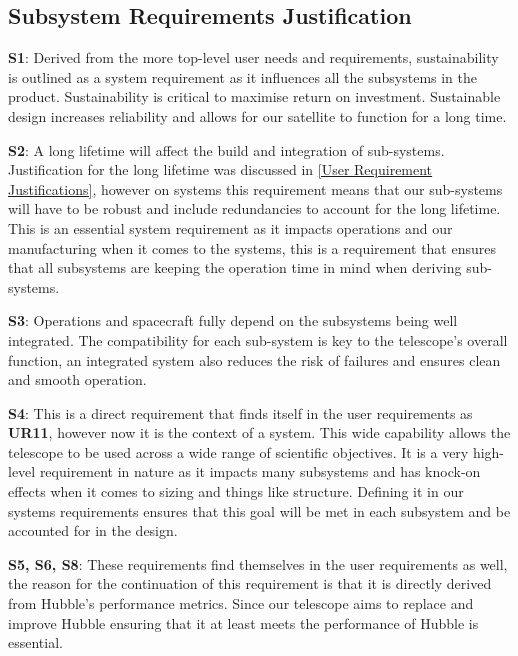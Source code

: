 \subsection{Subsystem Requirements Justification}
\textbf{S1}: Derived from the more top-level user needs and requirements, sustainability is outlined as a system requirement as it influences all the subsystems in the product. Sustainability is critical to maximise return on investment. Sustainable design increases reliability and allows for our satellite to function for a long time. \\
\vspace{1.5mm}

\textbf{S2}: A long lifetime will affect the build and integration of sub-systems. Justification for the long lifetime was discussed in \ref{User Requirement Justifications}, however on systems this requirement means that our sub-systems will have to be robust and include redundancies to account for the long lifetime. This is an essential system requirement as it impacts operations and our manufacturing when it comes to the systems, this is a requirement that ensures that all subsystems are keeping the operation time in mind when deriving sub-systems.\\
\vspace{1.5mm}

\textbf{S3}: Operations and spacecraft fully depend on the subsystems being well integrated. The compatibility for each sub-system is key to the telescope's overall function, an integrated system also reduces the risk of failures and ensures clean and smooth operation.\\
\vspace{1.5mm}

\textbf{S4}: This is a direct requirement that finds itself in the user requirements as \textbf{UR11}, however now it is the context of a system. This wide capability allows the telescope to be used across a wide range of scientific objectives. It is a very high-level requirement in nature as it impacts many subsystems and has knock-on effects when it comes to sizing and things like structure. Defining it in our systems requirements ensures that this goal will be met in each subsystem and be accounted for in the design.\\
\vspace{1.5mm}

\textbf{S5, S6, S8}: These requirements find themselves in the user requirements as well, the reason for the continuation of this requirement is that it is directly derived from Hubble's performance metrics. Since our telescope aims to replace and improve Hubble ensuring that it at least meets the performance of Hubble is essential. \\
\vspace{1.5mm}


